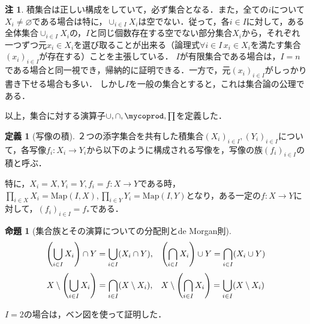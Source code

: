 \documentclass[uplatex, 12pt, dvipdfmx]{jsreport}
\theoremstyle{definition}
\newtheorem{proposition}[theorem]{命題}
\newtheorem{definition}[theorem]{定義}
\newtheorem{remark}[theorem]{注}
\theoremstyle{StatementsWithStar}
\theoremstyle{StatementsWithStar2}
\theoremstyle{StatementsWithStar3}
\theoremstyle{StatementsWithCCirc}
\theoremstyle{definition}
\let\coprod\mycoprod
\begin{document}
        \begin{remark}
            積集合は正しい構成をしていて，必ず集合となる．また，全ての$i$について$X_i\ne\varnothing$である場合は特に，$\cup_{i\in I}X_i$は空でない．従って，各$i\in I$に対して，ある全体集合$\cup_{i\in I}X_i$の，$I$と同じ個数存在する空でない部分集合$X_i$から，それぞれ一つずつ元$x_i\in X_i$を選び取ることが出来る（論理式$\forall i\in I\, x_i\in X_i$を満たす集合$(x_i)_{i\in I}$が存在する）ことを主張している．
            $I$が有限集合である場合は，$I=n$である場合と同一視でき，帰納的に証明できる．一方で，元$(x_i)_{i\in I}$がしっかり書き下せる場合も多い．
            しかし$I$を一般の集合とすると，これは集合論の公理である．
        \end{remark}
以上，集合に対する演算子$\cup,\cap,\coprod,\prod$を定義した．
\begin{definition}[写像の積]
    ２つの添字集合を共有した積集合$(X_i)_{i\in I},(Y_i)_{i\in I}$について，各写像$f_i:X_i\to Y_i$から以下のように構成される写像を，写像の族$(f_i)_{i\in I}$の積と呼ぶ．
    \begin{center}\end{center}
    特に，$X_i=X, Y_i=Y, f_i=f:X\to Y$である時，$\prod_{i\in X}X_i=\mathrm{Map}(I,X), \prod_{i\in Y}Y_i=\mathrm{Map}(I,Y)$となり，ある一定の$f:X\to Y$に対して，$(f_i)_{i\in I}=f_*$である．
\end{definition}


\begin{proposition}[集合族とその演算についての分配則とde Morgan則]
    $$\left(\bigcup_{i\in I}X_i\right)\cap Y = \bigcup_{i\in I}(X_i\cap Y), \hspace{3mm}\left(\bigcap_{i\in I}X_i\right)\cup Y = \bigcap_{i\in I}(X_i\cup Y)$$
    $$X\setminus\left(\bigcup_{i\in I}X_i\right)=\bigcap_{i\in I}(X\setminus X_i), \hspace{3mm}X\setminus\left(\bigcap_{i\in I}X_i\right)=\bigcup_{i\in I}(X\setminus X_i)$$
\end{proposition}
$I=2$の場合は，ベン図を使って証明した．
\end{document}
